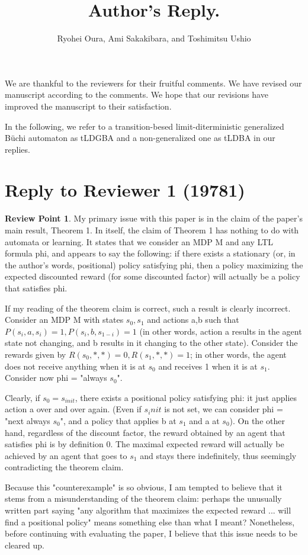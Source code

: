 \documentclass[10 pt, dvipdfmx]{article}
\title{\LARGE \bf
Author's Reply.
}
\author{Ryohei Oura, Ami Sakakibara, and Toshimitsu Ushio}
\theoremstyle{definition}
\newtheorem{review point}{Review Point}[section]
\begin{document}
\maketitle

We are thankful to the reviewers for their fruitful comments. We have revised our
manuscript according to the comments. We hope that our revisions have improved
the manuscript to their satisfaction.

In the following, we refer to a transition-besed limit-diterministic generalized B\"{u}chi automaton as tLDGBA and a non-generalized one as tLDBA in our replies.

\section{Reply to Reviewer 1 (19781)}

\begin{review point}
  My primary issue with this paper is in the claim of
the paper's main result, Theorem 1. In itself, the claim of Theorem 1
has nothing to do with automata or learning. It states that we consider
an MDP M and any LTL formula phi, and appears to say the following: if
there exists a stationary (or, in the author's words, positional)
policy satisfying phi, then a policy maximizing the expected discounted
reward (for some discounted factor) will actually be a policy that
satisfies phi.

If my reading of the theorem claim is correct, such a result is clearly
incorrect. Consider an MDP M with states {$s_0,s_1$} and actions {a,b}
such that $P(s_i,a,s_i)=1, P(s_i,b,s_{1-i})=1$ (in other words, action a
results in the agent state not changing, and b results in it changing
to the other state). Consider the rewards given by $R(s_0,*,*)=0,
R(s_1,*,*)=1$; in other words, the agent does not receive anything when
it is at $s_0$ and receives 1 when it is at $s_1$. Consider now phi =
"always $s_0$".

Clearly, if $s_0=s_{init}$, there exists a positional policy satisfying
phi: it just applies action a over and over again. (Even if $s_init$ is
not set, we can consider phi = "next always $s_0$", and a policy that
applies b at $s_1$ and a at $s_0$). On the other hand, regardless of the
discount factor, the reward obtained by an agent that satisfies phi is
by definition 0. The maximal expected reward will actually be achieved
by an agent that goes to $s_1$ and stays there indefinitely, thus
seemingly contradicting the theorem claim.

Because this "counterexample" is so obvious, I am tempted to believe
that it stems from a misunderstanding of the theorem claim: perhaps the
unusually written part saying "any algorithm that maximizes the
expected reward ... will find a positional policy" means something else
than what I meant? Nonetheless, before continuing with evaluating the
paper, I believe that this issue needs to be cleared up.

\end{review point}
\end{document}
